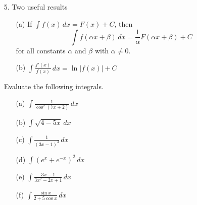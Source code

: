\documentclass[12pt]{article}
\newenvironment{examples}{\noindent{\bf Examples }}{\vspace{0mm}}
\newcommand{\ds}{\displaystyle}
\begin{document}
\begin{enumerate}
\item[5.]
Two useful results
\begin{enumerate}
	\item[(a)]
	If $\ds \int f(x) \, dx = F(x) + C$, then
	$$
	\int f(\alpha x + \beta) \, dx = \frac{1}{\alpha}F(\alpha x + \beta) + C
	$$
	for all constants $\alpha$ and $\beta$ with $\alpha \ne 0$.
	\vspace{0.2cm}
	\item[(b)]
	$\ds \int \frac{f'(x)}{f(x)} \, dx = \ln\left|f(x)\right| + C$
\end{enumerate}

\vspace{0.3cm}

\begin{examples}
Evaluate the following integrals.
\begin{enumerate}
\item[(a)]
$\ds \int \frac{1}{\cos^2(7x + 2)} \, dx$
\item[(b)]
$\ds \int \sqrt{4 - 5x} \, dx$
\item[(c)]
$\ds \int \frac{1}{(3x - 1)^3} \, dx$
\item[(d)]
$\ds \int \left(e^x + e^{-x}\right)^2 \, dx$
\item[(e)]
$\ds \int \frac{3x-1}{3x^2 - 2x + 1} \, dx$
\item[(f)]
$\ds \int \frac{\sin x}{2 + 5\cos x} \, dx$
\end{enumerate}

\vspace{0.2cm}


\end{examples}
\end{enumerate}
\end{document}

